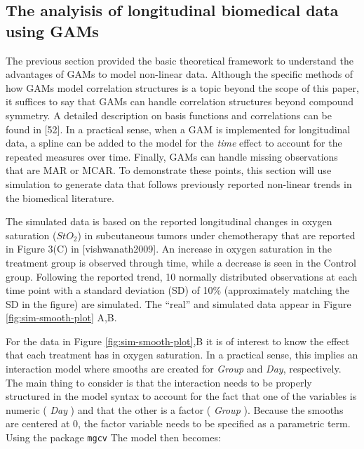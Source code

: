 \documentclass[
]{article}
\begin{document}
\newpage

\hypertarget{the-analyisis-of-longitudinal-biomedical-data-using-gams}{%
\subsection{The analyisis of longitudinal biomedical data using GAMs}\label{the-analyisis-of-longitudinal-biomedical-data-using-gams}}

The previous section provided the basic theoretical framework to understand the advantages of GAMs to model non-linear data. Although the specific methods of how GAMs model correlation structures is a topic beyond the scope of this paper, it suffices to say that GAMs can handle correlation structures beyond compound symmetry. A detailed description on basis functions and correlations can be found in {[}52{]}. In a practical sense, when a GAM is implemented for longitudinal data, a spline can be added to the model for the \emph{time} effect to account for the repeated measures over time. Finally, GAMs can handle missing observations that are MAR or MCAR. To demonstrate these points, this section will use simulation to generate data that follows previously reported non-linear trends in the biomedical literature.

The simulated data is based on the reported longitudinal changes in oxygen saturation (\(StO_2\)) in subcutaneous tumors under chemotherapy that are reported in Figure 3(C) in {[}vishwanath2009{]}. An increase in oxygen saturation in the treatment group is observed through time, while a decrease is seen in the Control group. Following the reported trend, 10 normally distributed observations at each time point with a standard deviation (SD) of 10\% (approximately matching the SD in the figure) are simulated. The ``real'' and simulated data appear in Figure \ref{fig:sim-smooth-plot} A,B.

For the data in Figure \ref{fig:sim-smooth-plot},B it is of interest to know the effect that each treatment has in oxygen saturation. In a practical sense, this implies an interaction model where smooths are created for \emph{Group} and \emph{Day}, respectively. The main thing to consider is that the interaction needs to be properly structured in the model syntax to account for the fact that one of the variables is numeric ( \emph{Day} ) and that the other is a factor ( \emph{Group} ). Because the smooths are centered at 0, the factor variable needs to be specified as a parametric term. Using the package \texttt{mgcv} The model then becomes:
\end{document}

